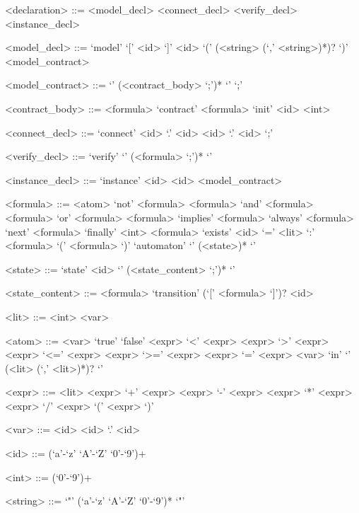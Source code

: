 \begin{grammar}
  <declaration> ::= <model\_decl>
  \alt <connect\_decl>
  \alt <verify\_decl>
  \alt <instance\_decl>

  <model\_decl> ::= `model' `[' <id> `]' <id> `(' (<string> (`,' <string>)*)? `)' <model\_contract>

  <model\_contract> ::= `{' (<contract\_body> `;')* `}'
  \alt `;'

  <contract\_body> ::= <formula>
  \alt `contract' <formula>
  \alt `init' <id> <int>

  <connect\_decl> ::= `connect' <id> `.' <id> <id> `.' <id> `;'

  <verify\_decl> ::= `verify' `{' (<formula> `;')* `}'

  <instance\_decl> ::= `instance' <id> <id> <model\_contract>

  <formula> ::= <atom>
  \alt `not' <formula>
  \alt <formula> `and' <formula>
  \alt <formula> `or' <formula>
  \alt <formula> `implies' <formula>
  \alt `always' <formula>
  \alt `next' <formula>
  \alt `finally' <int> <formula>
  \alt `exists' <id> `=' <lit> `:' <formula>
  \alt `(' <formula> `)'
  \alt `automaton' `{' (<state>)* `}'
  
  <state> ::= `state' <id> `{' (<state\_content> `;')* `}'

  <state\_content> ::= <formula>
  \alt `transition' (`[' <formula> `]')? <id>

  <lit> ::= <int>
  \alt <var>

  <atom> ::= <var>
  \alt `true'
  \alt `false'
  \alt <expr> `<' <expr>
  \alt <expr> `>' <expr>
  \alt <expr> `<=' <expr>
  \alt <expr> `>=' <expr>
  \alt <expr> `=' <expr>
  \alt <var> `in' `{' (<lit> (`,' <lit>)*)? `}'

  <expr> ::= <lit>
  \alt <expr> `+' <expr>
  \alt <expr> `-' <expr>
  \alt <expr> `*' <expr>
  \alt <expr> `/' <expr>
  \alt `(' <expr> `)'

  <var> ::= <id>
  \alt <id> `.' <id>
  
  <id> ::= (`a'-`z' `A'-`Z' `0'-`9')+
  
  <int> ::= (`0'-`9')+

  <string> ::= `"' (`a'-`z' `A'-`Z' `0'-`9')* `"'
\end{grammar}
